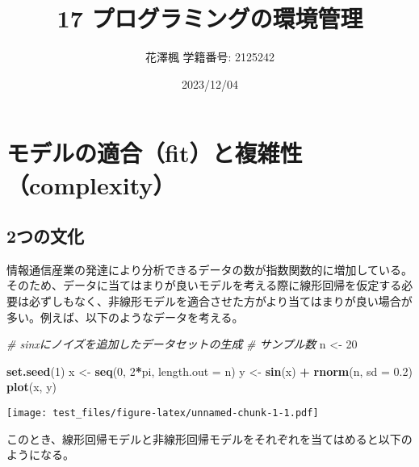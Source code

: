 \documentclass[
  pandoc,
  jafont=haranoaji]{bxjsarticle}
\title{17 プログラミングの環境管理}
\author{花澤楓 学籍番号: 2125242}
\date{2023/12/04}
\newenvironment{Shaded}{\begin{snugshade}}{\end{snugshade}}
\newcommand{\AttributeTok}[1]{\textcolor[rgb]{0.13,0.29,0.53}{#1}}
\newcommand{\CommentTok}[1]{\textcolor[rgb]{0.56,0.35,0.01}{\textit{#1}}}
\newcommand{\DecValTok}[1]{\textcolor[rgb]{0.00,0.00,0.81}{#1}}
\newcommand{\FloatTok}[1]{\textcolor[rgb]{0.00,0.00,0.81}{#1}}
\newcommand{\FunctionTok}[1]{\textcolor[rgb]{0.13,0.29,0.53}{\textbf{#1}}}
\newcommand{\NormalTok}[1]{#1}
\newcommand{\OtherTok}[1]{\textcolor[rgb]{0.56,0.35,0.01}{#1}}
\newcommand{\SpecialCharTok}[1]{\textcolor[rgb]{0.81,0.36,0.00}{\textbf{#1}}}
\begin{document}
\maketitle

\hypertarget{ux30e2ux30c7ux30ebux306eux9069ux5408fitux3068ux8907ux96d1ux6027complexity}{%
\section{モデルの適合（fit）と複雑性（complexity）}\label{ux30e2ux30c7ux30ebux306eux9069ux5408fitux3068ux8907ux96d1ux6027complexity}}

\hypertarget{ux3064ux306eux6587ux5316}{%
\subsection{2つの文化}\label{ux3064ux306eux6587ux5316}}

情報通信産業の発達により分析できるデータの数が指数関数的に増加している。そのため、データに当てはまりが良いモデルを考える際に線形回帰を仮定する必要は必ずしもなく、非線形モデルを適合させた方がより当てはまりが良い場合が多い。例えば、以下のようなデータを考える。

\begin{Shaded}
\begin{Highlighting}[]
\CommentTok{\# sinxにノイズを追加したデータセットの生成}
\CommentTok{\# サンプル数}
\NormalTok{n }\OtherTok{\textless{}{-}} \DecValTok{20}

\FunctionTok{set.seed}\NormalTok{(}\DecValTok{1}\NormalTok{)}
\NormalTok{x }\OtherTok{\textless{}{-}} \FunctionTok{seq}\NormalTok{(}\DecValTok{0}\NormalTok{, }\DecValTok{2}\SpecialCharTok{*}\NormalTok{pi, }\AttributeTok{length.out =}\NormalTok{ n)}
\NormalTok{y }\OtherTok{\textless{}{-}} \FunctionTok{sin}\NormalTok{(x) }\SpecialCharTok{+} \FunctionTok{rnorm}\NormalTok{(n, }\AttributeTok{sd =} \FloatTok{0.2}\NormalTok{)}
\FunctionTok{plot}\NormalTok{(x, y)}
\end{Highlighting}
\end{Shaded}

\texttt{[image: test\_files/figure-latex/unnamed-chunk-1-1.pdf]}

このとき、線形回帰モデルと非線形回帰モデルをそれぞれを当てはめると以下のようになる。
\end{document}
